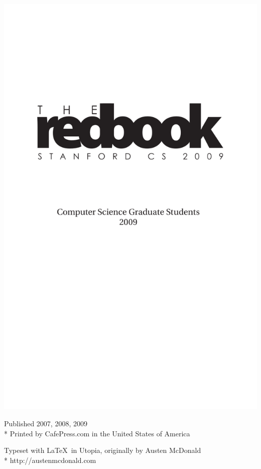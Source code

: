 \documentclass[10pt]{book}
\newenvironment{fullpage}{%
  \begin{list}{}{%
    \setlength{\topmargin}{-1in}
    \setlength{\textheight}{8in}
    \setlength{\topsep}{0pt}%
    \setlength{\leftmargin}{-.6in}%
    \setlength{\listparindent}{\parindent}%
    \setlength{\itemindent}{\parindent}%
    \setlength{\parsep}{\parskip}%
  }%
  \item[]}{\end{list}}
\begin{document}
\thispagestyle{empty}
\mbox{}
\newpage

\thispagestyle{empty}
\begin{fullpage}
\includegraphics{2009-redbook-titlepage.pdf}
\end{fullpage}
\vfil\eject

\vspace*{5in}
{\small
\noindent Published 2007, 2008, 2009\\*
Printed by CafePress.com in the United States of America

\noindent Typeset with \LaTeX\ in Utopia, originally by Austen McDonald\\*
http://austenmcdonald.com
}
\thispagestyle{empty}
\vfil\eject
\end{document}
